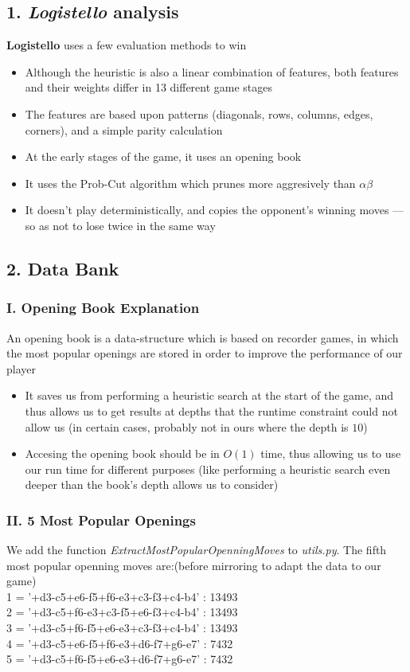 \documentclass{article}
\begin{document}
\subsection*{1. \emph{Logistello} analysis}
\textbf{Logistello} uses a few evaluation methods to win
\begin{itemize}
\item Although the heuristic is also a linear combination of features, both features and their weights differ in 13 different game stages
\item The features are based upon patterns (diagonals, rows, columns, edges, corners), and a simple parity calculation
\item At the early stages of the game, it uses an opening book
\item It uses the Prob-Cut algorithm which prunes more aggresively than $\alpha\beta$
\item It doesn't play deterministically, and copies the opponent's winning moves --- so as not to lose twice in the same way
\end{itemize}

\subsection*{2. Data Bank}
\subsubsection*{I. Opening Book Explanation}
An opening book is a data-structure which is based on recorder games, in which the most popular openings are stored in order to improve the performance of our player 
\begin{itemize}
\item It saves us from performing a heuristic search at the start of the game, and thus allows us to get results at depths that the runtime constraint could not allow us (in certain cases, probably not in ours where the depth is $10$)	
\item Accesing the opening book should be in $O(1)$ time, thus allowing us to use our run time for different purposes (like performing a heuristic search even deeper than the book's depth allows us to consider)
\end{itemize}

\subsubsection*{II. 5 Most Popular Openings}
We add the function \emph{ExtractMostPopularOpenningMoves} to \emph{utils.py}.
The fifth most popular openning moves are:(before mirroring to adapt the data to our game)\\
1 = '+d3-c5+e6-f5+f6-e3+c3-f3+c4-b4' : 13493\\
2 = '+d3-c5+f6-e3+c3-f5+e6-f3+c4-b4' : 13493\\
3 = '+d3-c5+f6-f5+e6-e3+c3-f3+c4-b4' : 13493\\
4 =  '+d3-c5+e6-f5+f6-e3+d6-f7+g6-e7' : 7432\\
5 = '+d3-c5+f6-f5+e6-e3+d6-f7+g6-e7' : 7432\\
\end{document}

